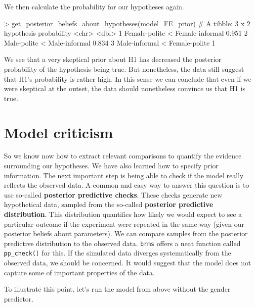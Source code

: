 \documentclass[nobib]{tufte-handout}
\begin{document}
\vspace{-0.5cm}

We then calculate the probability for our hypotheses again.

\begin{minipage}[]{\textwidth}
\begin{rc}
> get_posterior_beliefs_about_hypotheses(model_FE_prior)
# A tibble: 3 x 2
  hypothesis                      probability
  <chr>                                 <dbl>
1 Female-polite < Female-informal       0.951
2 Male-polite < Male-informal           0.834
3 Male-informal < Female-polite         1   
\end{rc}
\end{minipage}

\vspace{-0.5cm}


\noindent We see that a very skeptical prior about H1 has decreased the posterior probability
of the hypothesis being true. But nonetheless, the data still suggest that H1's probability is
rather high. In this sense we can conclude that even if we were skeptical at the outset, the
data should nonetheless convince us that H1 is true.

\section{Model criticism}

So we know now how to extract relevant comparisons to quantify the evidence surrounding our hypotheses. We have also learned how to specify prior information. The next important step is being able to check if the model really reflects the observed data. A common and easy way to answer this question is to use so-called \textbf{posterior predictive checks}. These checks generate new hypothetical data, sampled from the so-called \textbf{posterior predictive distribution}. This distribution quantifies how likely we would expect to see a particular outcome if the experiment were repeated in the same way  (given our posterior beliefs about parameters). We can compare samples from the posterior predictive distribution to the observed data. \texttt{brms} offers a neat function called \texttt{pp\_check()} for this. If the simulated data diverges systematically from the observed data, we should be concerned. It would suggest that the model does not capture some of important properties of the data. 

To illustrate this point, let's run the model from above without the gender predictor. 
\end{document}
